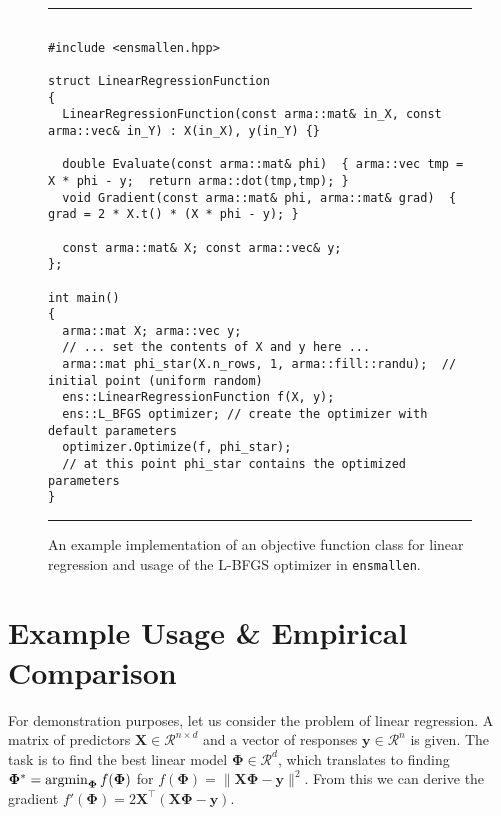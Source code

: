\documentclass[twoside,11pt]{article}
\begin{document}
\begin{figure}[b!]
\hrule
\vspace{1ex}
\centering
\begin{verbatim}

#include <ensmallen.hpp>

struct LinearRegressionFunction
{
  LinearRegressionFunction(const arma::mat& in_X, const arma::vec& in_Y) : X(in_X), y(in_Y) {}

  double Evaluate(const arma::mat& phi)  { arma::vec tmp = X * phi - y;  return arma::dot(tmp,tmp); }
  void Gradient(const arma::mat& phi, arma::mat& grad)  { grad = 2 * X.t() * (X * phi - y); }

  const arma::mat& X; const arma::vec& y;
};

int main() 
{
  arma::mat X; arma::vec y;
  // ... set the contents of X and y here ...
  arma::mat phi_star(X.n_rows, 1, arma::fill::randu);  // initial point (uniform random)
  ens::LinearRegressionFunction f(X, y);
  ens::L_BFGS optimizer; // create the optimizer with default parameters
  optimizer.Optimize(f, phi_star);
  // at this point phi_star contains the optimized parameters
}
\end{verbatim}
\hrule
\vspace*{-0.5em}
\caption{An example implementation of an objective function class for linear
regression and usage of the L-BFGS optimizer in {\tt ensmallen}.
}
\label{fig:lr_function}
\vspace*{-2em}
\end{figure}


\section{Example Usage \& Empirical Comparison}

For demonstration purposes, let us consider the problem of linear regression.
A matrix of predictors $\bm X \in \mathcal{R}^{n \times d}$
and a vector of responses $\bm y \in \mathcal{R}^n$ is given.
The task is to find the best linear model $\bm \Phi \in \mathcal{R}^d$,
which translates to finding
$\bm \Phi^* = \operatornamewithlimits{argmin}_{\bm\Phi} f(\bm \Phi)$ for
$f(\bm \Phi) = \| \bm X \bm \Phi - \bm y \|^2.$
From this we can derive the gradient
$f'(\bm \Phi) = 2 \bm X^{\top} (\bm X \bm \Phi - \bm y).$
\end{document}
